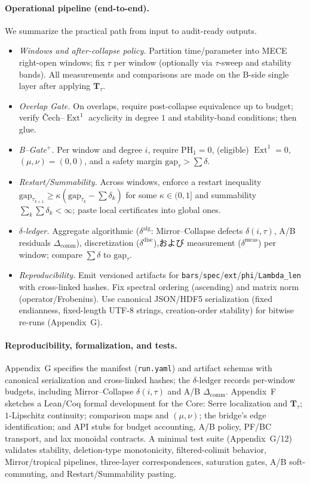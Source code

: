 \documentclass[11pt]{article}
\numberwithin{equation}{section}
\theoremstyle{plain}
\theoremstyle{definition}
\theoremstyle{remark}
\DeclareMathOperator{\Ext}{Ext}
\theoremstyle{plain}
\theoremstyle{definition}
\numberwithin{equation}{section}
\theoremstyle{definition}
\numberwithin{equation}{section}
\theoremstyle{plain}
\theoremstyle{definition}
\theoremstyle{remark}
\begin{document}
\paragraph{Operational pipeline (end-to-end).}
We summarize the practical path from input to audit-ready outputs.
\begin{itemize}
  \item \emph{Windows and after-collapse policy.} Partition time/parameter into MECE right-open windows; fix \(\tau\) per window (optionally via \(\tau\)-sweep and stability bands). All measurements and comparisons are made on the B-side single layer after applying \(\mathbf{T}_\tau\).
  \item \emph{Overlap Gate.} On overlaps, require post-collapse equivalence up to budget; verify Čech--\(\Ext^1\) acyclicity in degree \(1\) and stability-band conditions; then glue.
  \item \emph{B--Gate\(^{+}\).} Per window and degree \(i\), require \(\mathrm{PH}_1=0\), (eligible) \(\Ext^1=0\), \((\mu,\nu)=(0,0)\), and a safety margin \(\mathrm{gap}_\tau>\sum\delta\).
  \item \emph{Restart/Summability.} Across windows, enforce a restart inequality \(\mathrm{gap}_{\tau_{k+1}}\ge \kappa(\mathrm{gap}_{\tau_k}-\sum\delta_k)\) for some \(\kappa\in(0,1]\) and summability \(\sum_k\sum\delta_k<\infty\); paste local certificates into global ones.
  \item \emph{\(\delta\)-ledger.} Aggregate algorithmic (\(\delta^{\mathrm{alg}}\): Mirror--Collapse defects \(\delta(i,\tau)\), A/B residuals \(\Delta_{\mathrm{comm}}\)), discretization (\(\delta^{\mathrm{disc}}\)),および measurement (\(\delta^{\mathrm{meas}}\)) per window; compare \(\sum \delta\) to \(\mathrm{gap}_\tau\).
  \item \emph{Reproducibility.} Emit versioned artifacts for \texttt{bars}/\texttt{spec}/\texttt{ext}/\texttt{phi}/\texttt{Lambda\_len} with cross-linked hashes. Fix spectral ordering (ascending) and matrix norm (operator/Frobenius). Use canonical JSON/HDF5 serialization (fixed endianness, fixed-length UTF-8 strings, creation-order stability) for bitwise re-runs (Appendix~G).
\end{itemize}

\paragraph{Reproducibility, formalization, and tests.}
Appendix~G specifies the manifest (\texttt{run.yaml}) and artifact schemas with canonical serialization and cross-linked hashes; the \(\delta\)-ledger records per-window budgets, including Mirror--Collapse \(\delta(i,\tau)\) and A/B \(\Delta_{\mathrm{comm}}\). Appendix~F sketches a Lean/Coq formal development for the Core: Serre localization and \(\mathbf{T}_\tau\); \(1\)-Lipschitz continuity; comparison maps and \((\mu,\nu)\); the bridge’s edge identification; and API stubs for budget accounting, A/B policy, PF/BC transport, and lax monoidal contracts. A minimal test suite (Appendix~G/12) validates stability, deletion-type monotonicity, filtered-colimit behavior, Mirror/tropical pipelines, three-layer correspondences, saturation gates, A/B soft-commuting, and Restart/Summability pasting.
\end{document}
